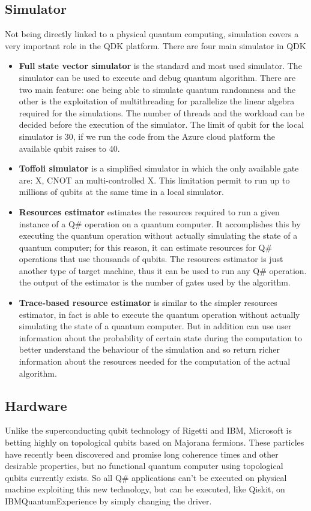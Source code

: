 \documentclass[main.tex]{subfiles}
\begin{document}
	\subsection{Simulator}
	Not being directly linked to a physical quantum computing, simulation covers a very important role in the QDK platform.
	There are four main simulator in QDK
	\begin{itemize}
	\item \textbf{Full state vector simulator} is the standard and most used simulator. The simulator can be used to execute and debug quantum algorithm.
	There are two main feature: one being able to simulate quantum randomness and the other is the exploitation of multithreading for parallelize the linear algebra required for the simulations. The number of threads and the workload can be decided before the execution of the simulator. The limit of qubit for the local simulator is 30, if we run the code from the Azure cloud platform the available qubit raises to 40.
	\item \textbf{Toffoli simulator} is a simplified simulator in which	the only available gate are: X, CNOT an multi-controlled X. This limitation permit to run up to millions of qubits at the same time in a local simulator.
	\item \textbf{Resources estimator} estimates the resources required to run a given instance of a Q\# operation on a quantum computer. It accomplishes this by executing the quantum operation without actually simulating the state of a quantum computer; for this reason, it can estimate resources for Q\# operations that use thousands of qubits. The resources estimator is just another type of target machine, thus it can be used to run any Q\# operation. the output of the estimator is the number of gates used by the algorithm.
	\item \textbf{Trace-based resource estimator} is similar to the simpler resources estimator, in fact is able to execute the quantum operation without actually simulating the state of a quantum computer. But in addition can use user information about the probability of certain state during the computation to better understand the behaviour of the simulation and so return richer information about the resources needed for the computation of the actual algorithm.
	\end{itemize}
	
	\subsection{Hardware}
	Unlike the superconducting qubit technology of Rigetti
and IBM, Microsoft is betting highly on topological
qubits based on Majorana fermions. These particles
have recently been discovered and promise long coherence times and other desirable properties, but no functional quantum computer using topological qubits currently exists. So all Q\# applications can't be executed on physical machine exploiting this new technology, but can be executed, like Qiskit, on IBMQuantumExperience by simply changing the driver.
\end{document}
